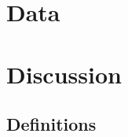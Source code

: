 \documentclass[a4paper]{article} %
\newcounter{source}
\begin{document}

\section {Data}











\section {Discussion}








\subsection{Definitions}
\end{document}
